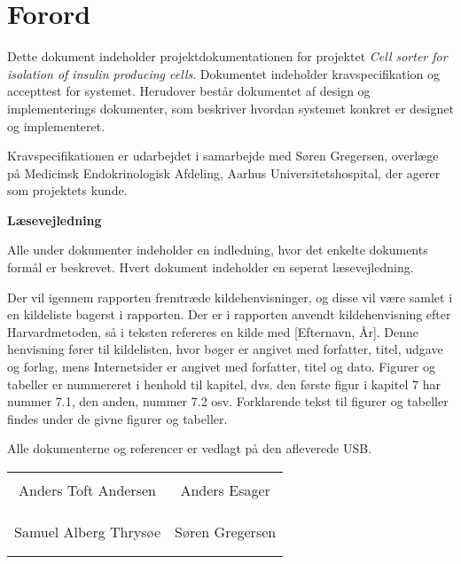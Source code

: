 \chapter*{Forord}

Dette dokument indeholder projektdokumentationen for projektet \textit{Cell sorter for isolation of insulin producing cells}. Dokumentet indeholder kravspecifikation og  accepttest for systemet. Herudover består dokumentet af design og implementerings dokumenter, som beskriver hvordan systemet konkret er designet og implementeret.

Kravspecifikationen er udarbejdet i samarbejde med Søren Gregersen, overlæge på Medicinsk Endokrinologisk Afdeling, Aarhus Universitetshospital, der agerer som projektets kunde. 

\textbf{Læsevejledning}

Alle under dokumenter indeholder en indledning, hvor det enkelte dokuments formål er beskrevet. Hvert dokument indeholder en seperat læsevejledning.

Der vil igennem rapporten fremtræde kildehenvisninger, og disse vil være samlet i en kildeliste bagerst i rapporten. Der er i rapporten anvendt kildehenvisning efter Harvardmetoden, så i teksten refereres en kilde med [Efternavn, År]. Denne henvisning fører til kildelisten, hvor bøger er angivet med forfatter, titel, udgave og forlag, mens Internetsider er angivet med forfatter, titel og dato. Figurer og tabeller er nummereret i henhold til kapitel, dvs. den første figur i kapitel 7 har nummer 7.1, den anden, nummer 7.2 osv. Forklarende tekst til figurer og tabeller findes under de givne figurer og tabeller.

Alle dokumenterne og referencer er vedlagt på den afleverede USB.

\phantom{Luft}

\phantom{Luft}

\begin{table}[H]
	\centering
		\begin{tabular}{c c}
			\underline{\phantom{mmmmmmmmmmmmmm}} & \underline{\phantom{mmmmmmmmmmmmmm}}  \\
			Anders Toft Andersen			& Anders Esager		 			\\
			&\\
			&\\
			\underline{\phantom{mmmmmmmmmmmmmm}} & \underline{\phantom{mmmmmmmmmmmmmm}}  \\
			Samuel Alberg Thrysøe			& Søren Gregersen 						\\
			&\\
			&\\
		 																									
		\end{tabular}
\end{table}